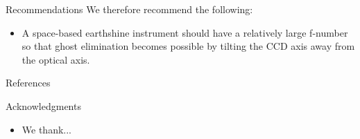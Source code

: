 \documentclass[final,hyperref={pdfpagelabels=false}]{beamer}
\begin{document}
\begin{frame}[t]
\begin{columns}[t]
\begin{column}{.23\textwidth}
\begin{block}{Recommendations}
We therefore recommend the following:
\begin{itemize}
   \item A space-based earthshine instrument should have a relatively large f-number so that ghost elimination becomes possible by tilting the CCD axis away from the optical axis.
\end{itemize}



\end{block}
 




\begin{block}{References}
        
\small{
} 

\end{block}


\begin{block}{Acknowledgments}
\begin{itemize}
\small 
\item We thank...
\end{itemize}
\end{block}


\end{column}
\end{columns}
\end{frame}
\end{document}
